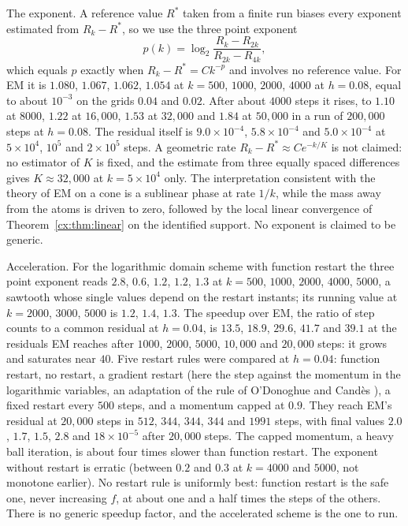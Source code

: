 The exponent. A reference value $R^*$ taken from a finite run biases every exponent estimated from $R_k-R^*$, so we use the three point exponent
\[
p(k)=\log_2\frac{R_k-R_{2k}}{R_{2k}-R_{4k}},
\]
which equals $p$ exactly when $R_k-R^*=Ck^{-p}$ and involves no reference value. For EM it is $1.080$, $1.067$, $1.062$, $1.054$ at $k=500$, $1000$, $2000$, $4000$ at $h=0.08$, equal to about $10^{-3}$ on the grids $0.04$ and $0.02$. After about $4000$ steps it rises, to $1.10$ at $8000$, $1.22$ at $16{,}000$, $1.53$ at $32{,}000$ and $1.84$ at $50{,}000$ in a run of $200{,}000$ steps at $h=0.08$. The residual itself is $9.0\times10^{-4}$, $5.8\times10^{-4}$ and $5.0\times10^{-4}$ at $5\times10^4$, $10^5$ and $2\times10^5$ steps. A geometric rate $R_k-R^*\approx Ce^{-k/K}$ is not claimed: no estimator of $K$ is fixed, and the estimate from three equally spaced differences gives $K\approx32{,}000$ at $k=5\times10^4$ only. The interpretation consistent with the theory of EM on a cone is a sublinear phase at rate $1/k$, while the mass away from the atoms is driven to zero, followed by the local linear convergence of Theorem~\ref{cx:thm:linear} on the identified support. No exponent is claimed to be generic.

Acceleration. For the logarithmic domain scheme with function restart the three point exponent reads $2.8$, $0.6$, $1.2$, $1.2$, $1.3$ at $k=500$, $1000$, $2000$, $4000$, $5000$, a sawtooth whose single values depend on the restart instants; its running value at $k=2000$, $3000$, $5000$ is $1.2$, $1.4$, $1.3$. The speedup over EM, the ratio of step counts to a common residual at $h=0.04$, is $13.5$, $18.9$, $29.6$, $41.7$ and $39.1$ at the residuals EM reaches after $1000$, $2000$, $5000$, $10{,}000$ and $20{,}000$ steps: it grows and saturates near $40$. Five restart rules were compared at $h=0.04$: function restart, no restart, a gradient restart (here the step against the momentum in the logarithmic variables, an adaptation of the rule of O'Donoghue and Cand\`es \cite{OC15}), a fixed restart every $500$ steps, and a momentum capped at $0.9$. They reach EM's residual at $20{,}000$ steps in $512$, $344$, $344$, $344$ and $1991$ steps, with final values $2.0$, $1.7$, $1.5$, $2.8$ and $18\times10^{-5}$ after $20{,}000$ steps. The capped momentum, a heavy ball iteration, is about four times slower than function restart. The exponent without restart is erratic (between $0.2$ and $0.3$ at $k=4000$ and $5000$, not monotone earlier). No restart rule is uniformly best: function restart is the safe one, never increasing $f$, at about one and a half times the steps of the others. There is no generic speedup factor, and the accelerated scheme is the one to run.

